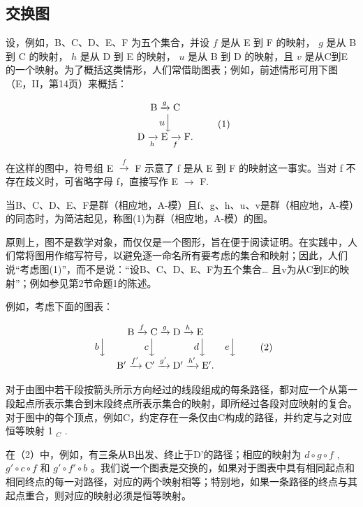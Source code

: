 \subsection{交换图}

设，例如，B、C、D、E、F 为五个集合，并设 \(f\) 是从 E 到 F 的映射， \(g\) 是从 B 到 C 的映射， \(h\) 是从 D 到 E 的映射， \(u\) 是从 B 到 D 的映射，且 \(v\) 是从C到E的一个映射。为了概括这类情形，人们常借助图表；例如，前述情形可用下图（E，II，第14页）来概括：

\[
\begin{array}{c} \mathrm{B} \xrightarrow {g} \mathrm{C} \\ u \Big \downarrow \\ \mathrm{D} \xrightarrow [ h ]{} \mathrm{E} \xrightarrow [ f ]{} \mathrm{F}. \end{array}\tag{1}
\]

在这样的图中，符号组 E \(\xrightarrow{f}\) F 示意了 f 是从 E 到 F 的映射这一事实。当对 f 不存在歧义时，可省略字母 f，直接写作 E \(\rightarrow\) F.

当B、C、D、E、F是群（相应地，A-模）且f、g、h、u、v是群（相应地，A-模）的同态时，为简洁起见，称图(1)为群（相应地，A-模）的图。

原则上，图不是数学对象，而仅仅是一个图形，旨在便于阅读证明。在实践中，人们常将图用作缩写符号，以避免逐一命名所有要考虑的集合和映射；因此，人们说“考虑图(1)”，而不是说：“设B、C、D、E、F为五个集合\ldots{} 且v为从C到E的映射”；例如参见第2节命题1的陈述。

例如，考虑下面的图表：

\[
\begin{array}{c} \mathrm{B} \xrightarrow {f} \mathrm{C} \xrightarrow {g} \mathrm{D} \xrightarrow {h} \mathrm{E} \\ b \Big \downarrow \qquad \qquad c \Big \downarrow \qquad \qquad d \Big \downarrow \qquad e \Big \downarrow \\ \mathrm{B} ^ {\prime} \xrightarrow {f ^ {\prime}} \mathrm{C} ^ {\prime} \xrightarrow {g ^ {\prime}} \mathrm{D} ^ {\prime} \xrightarrow {h ^ {\prime}} \mathrm{E} ^ {\prime}. \end{array}\tag{2}
\]

对于由图中若干段按箭头所示方向经过的线段组成的每条路径，都对应一个从第一段起点所表示集合到末段终点所表示集合的映射，即所经过各段对应映射的复合。对于图中的每个顶点，例如C，约定存在一条仅由C构成的路径，并约定与之对应恒等映射 1 \(_{C}\) .

在（2）中，例如，有三条从B出发、终止于D'的路径；相应的映射为 \(d \circ g \circ f\) , \(g' \circ c \circ f\) 和 \(g' \circ f' \circ b\) 。我们说一个图表是交换的，如果对于图表中具有相同起点和相同终点的每一对路径，对应的两个映射相等；特别地，如果一条路径的终点与其起点重合，则对应的映射必须是恒等映射。

